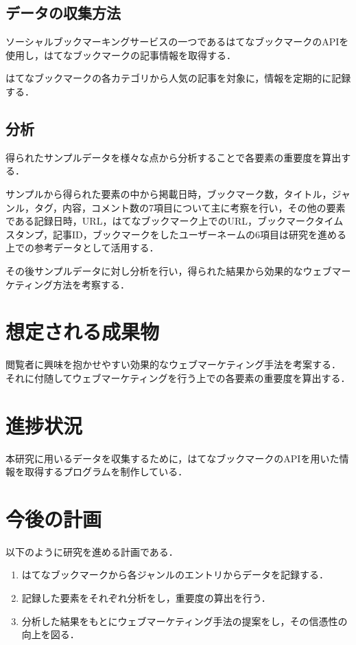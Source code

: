 \documentclass[uplatex,twocolumn,dvipdfmx]{jsarticle}
\begin{document}
\subsection{データの収集方法}
ソーシャルブックマーキングサービスの一つであるはてなブックマークのAPI\cite{hatena}を使用し，はてなブックマークの記事情報を取得する．\par
はてなブックマークの各カテゴリから人気の記事を対象に，情報を定期的に記録する．

\subsection{分析}
得られたサンプルデータを様々な点から分析することで各要素の重要度を算出する．\par
サンプルから得られた要素の中から掲載日時，ブックマーク数，タイトル，ジャンル，タグ，内容，コメント数の7項目について主に考察を行い，その他の要素である記録日時，URL，はてなブックマーク上でのURL，ブックマークタイムスタンプ，記事ID，ブックマークをしたユーザーネームの6項目は研究を進める上での参考データとして活用する．\par
その後サンプルデータに対し分析を行い，得られた結果から効果的なウェブマーケティング方法を考察する．


\section{想定される成果物}

閲覧者に興味を抱かせやすい効果的なウェブマーケティング手法を考案する．
それに付随してウェブマーケティングを行う上での各要素の重要度を算出する．


\section{進捗状況}

本研究に用いるデータを収集するために，はてなブックマークのAPIを用いた情報を取得するプログラムを制作している．

\section{今後の計画}
以下のように研究を進める計画である．

\begin{enumerate}
\item はてなブックマークから各ジャンルのエントリからデータを記録する．
\item 記録した要素をそれぞれ分析をし，重要度の算出を行う．
\item 分析した結果をもとにウェブマーケティング手法の提案をし，その信憑性の向上を図る．
\end{enumerate}



\end{document}
